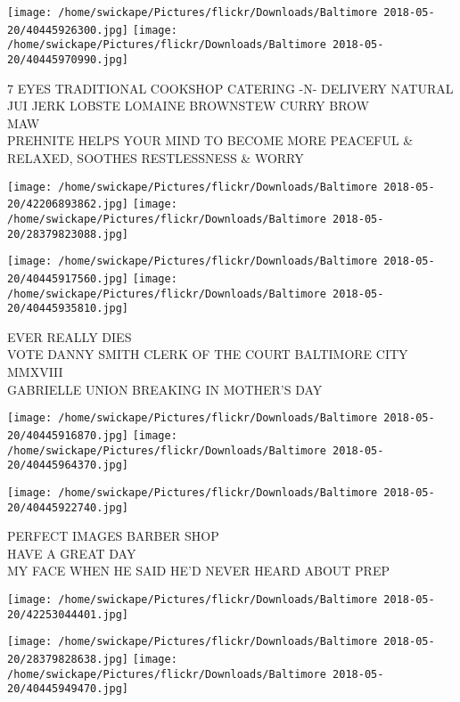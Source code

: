 \documentclass[10pt,letterpaper]{article}
\begin{document}
\vspace{0.25in}
\texttt{[image: /home/swickape/Pictures/flickr/Downloads/Baltimore 2018-05-20/40445926300.jpg]}
\texttt{[image: /home/swickape/Pictures/flickr/Downloads/Baltimore 2018-05-20/40445970990.jpg]}

7 EYES TRADITIONAL COOKSHOP CATERING {-}N{-} DELIVERY NATURAL JUI JERK LOBSTE LOMAINE BROWNSTEW CURRY BROW\\
MAW\\
PREHNITE HELPS YOUR MIND TO BECOME MORE PEACEFUL \& RELAXED, SOOTHES RESTLESSNESS \& WORRY\\
\pagebreak

\texttt{[image: /home/swickape/Pictures/flickr/Downloads/Baltimore 2018-05-20/42206893862.jpg]}
\texttt{[image: /home/swickape/Pictures/flickr/Downloads/Baltimore 2018-05-20/28379823088.jpg]}

\texttt{[image: /home/swickape/Pictures/flickr/Downloads/Baltimore 2018-05-20/40445917560.jpg]}
\texttt{[image: /home/swickape/Pictures/flickr/Downloads/Baltimore 2018-05-20/40445935810.jpg]}

EVER REALLY DIES\\
VOTE DANNY SMITH CLERK OF THE COURT BALTIMORE CITY\\
MMXVIII\\
GABRIELLE UNION BREAKING IN MOTHER'S DAY\\
\pagebreak

\texttt{[image: /home/swickape/Pictures/flickr/Downloads/Baltimore 2018-05-20/40445916870.jpg]}
\texttt{[image: /home/swickape/Pictures/flickr/Downloads/Baltimore 2018-05-20/40445964370.jpg]}

\texttt{[image: /home/swickape/Pictures/flickr/Downloads/Baltimore 2018-05-20/40445922740.jpg]}

PERFECT IMAGES BARBER SHOP\\
HAVE A GREAT DAY\\
MY FACE WHEN HE SAID HE'D NEVER HEARD ABOUT PREP\\
\pagebreak

\texttt{[image: /home/swickape/Pictures/flickr/Downloads/Baltimore 2018-05-20/42253044401.jpg]}

\vspace{0.25in}
\texttt{[image: /home/swickape/Pictures/flickr/Downloads/Baltimore 2018-05-20/28379828638.jpg]}
\texttt{[image: /home/swickape/Pictures/flickr/Downloads/Baltimore 2018-05-20/40445949470.jpg]}
\end{document}
